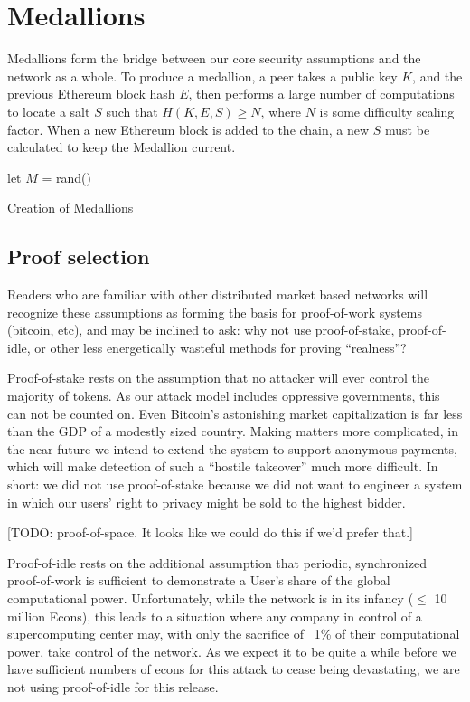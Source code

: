 \documentclass{article}
\begin{document}
\section{Medallions}
\label{medallions}

Medallions form the bridge between our core security assumptions and the network as a whole. To produce a medallion, a peer takes a public key $K$, and the previous Ethereum block hash $E$, then performs a large number of computations to locate a salt $S$ such that $H(K, E, S) \geq N$, where $N$ is some difficulty scaling factor. When a new Ethereum block is added to the chain, a new $S$ must be calculated to keep the Medallion current.

\begin{algorithm}[H]
  let $M$ = rand()\;
  \caption{Creation of Medallions}
\end{algorithm}

\subsection{Proof selection}

Readers who are familiar with other distributed market based networks will recognize these assumptions as forming the basis for proof-of-work systems (bitcoin, etc), and may be inclined to ask: why not use proof-of-stake, proof-of-idle, or other less energetically wasteful methods for proving “realness”?

Proof-of-stake rests on the assumption that no attacker will ever control the majority of tokens. As our attack model includes oppressive governments, this can not be counted on. Even Bitcoin’s astonishing market capitalization is far less than the GDP of a modestly sized country. Making matters more complicated, in the near future we intend to extend the system to support anonymous payments, which will make detection of such a ``hostile takeover'' much more difficult. In short: we did not use proof-of-stake because we did not want to engineer a system in which our users’ right to privacy might be sold to the highest bidder.

[TODO: proof-of-space. It looks like we could do this if we'd prefer that.]

Proof-of-idle rests on the additional assumption that periodic, synchronized proof-of-work is sufficient to demonstrate a User’s share of the global computational power. Unfortunately, while the network is in its infancy ($\leq$ 10 million Econs), this leads to a situation where any company in control of a supercomputing center may, with only the sacrifice of ~1\% of their computational power, take control of the network. As we expect it to be quite a while before we have sufficient numbers of econs for this attack to cease being devastating, we are not using proof-of-idle for this release.
\end{document}
